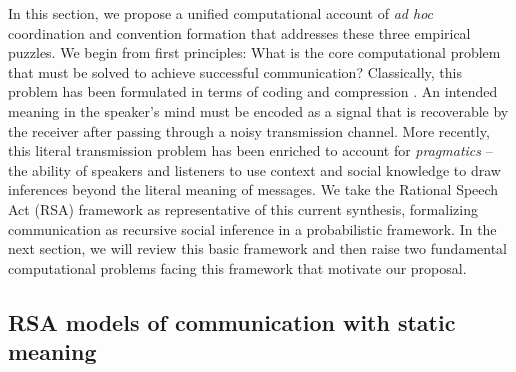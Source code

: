 
In this section, we propose a unified computational account of \emph{ad hoc} coordination and convention formation that addresses these three empirical puzzles. 
We begin from first principles: What is the core computational problem that must be solved to achieve successful communication?
Classically, this problem has been formulated in terms of coding and compression \cite{Shannon48}. 
An intended meaning in the speaker's mind must be encoded as a signal that is recoverable by the receiver after passing through a noisy transmission channel.
More recently, this literal transmission problem has been enriched to account for \emph{pragmatics} -- the ability of speakers and listeners to use context and social knowledge to draw inferences beyond the literal meaning of messages.
We take the Rational Speech Act (RSA) framework \cite{frank_predicting_2012,goodman_pragmatic_2016,FrankeJager16_ProbabilisticPragmatics} as representative of this current synthesis, formalizing communication as recursive social inference in a probabilistic framework.
In the next section, we will review this basic framework and then raise two fundamental computational problems facing this framework that motivate our proposal.

\subsection{RSA models of communication with static meaning}

